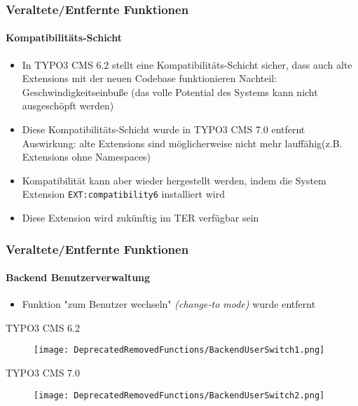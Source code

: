\begin{frame}[fragile]
	\frametitle{Veraltete/Entfernte Funktionen}
	\framesubtitle{Kompatibilitäts-Schicht}

	\begin{itemize}

		\item In TYPO3 CMS 6.2 stellt eine Kompatibilitäts-Schicht sicher,
			dass auch alte Extensions mit der neuen Codebase funktionieren\newline
			\small
				Nachteil: Geschwindigkeitseinbuße (das volle Potential des Systems kann nicht ausgeschöpft werden)
			\normalsize

		\item Diese Kompatibilitäts-Schicht wurde in TYPO3 CMS 7.0 entfernt\newline
			\small
				Auswirkung: alte Extensions sind möglicherweise nicht mehr lauffähig\newline(z.B. Extensions ohne Namespaces)
			\normalsize

		\item Kompatibilität kann aber wieder hergestellt werden, indem die System Extension \texttt{EXT:compatibility6} installiert wird
		\item Diese Extension wird zukünftig im TER verfügbar sein

	\end{itemize}

\end{frame}


\begin{frame}[fragile]
	\frametitle{Veraltete/Entfernte Funktionen}
	\framesubtitle{Backend Benutzerverwaltung}

	\begin{itemize}
		\item Funktion "zum Benutzer wechseln" \textit{(change-to mode)} wurde entfernt
	\end{itemize}

	\smaller\tabto{1cm}\begingroup\color{typo3red}TYPO3 CMS 6.2\endgroup\normalsize
	\begin{figure}\vspace{-0.4cm}
		\texttt{[image: DeprecatedRemovedFunctions/BackendUserSwitch1.png]}
	\end{figure}

	\smaller\tabto{1cm}\begingroup\color{typo3red}TYPO3 CMS 7.0\endgroup\normalsize
	\begin{figure}\vspace{-0.4cm}
		\texttt{[image: DeprecatedRemovedFunctions/BackendUserSwitch2.png]}
	\end{figure}

\end{frame}

